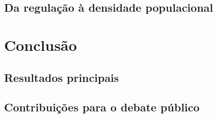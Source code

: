 \section{Da regulação à densidade populacional}
\label{sec:perg3}

\chapter{Conclusão}
\label{chp:conclusao}

\section{Resultados principais}
\label{sec:conclusao}

\section{Contribuições para o debate público}
\label{sec:contribuicoes}

